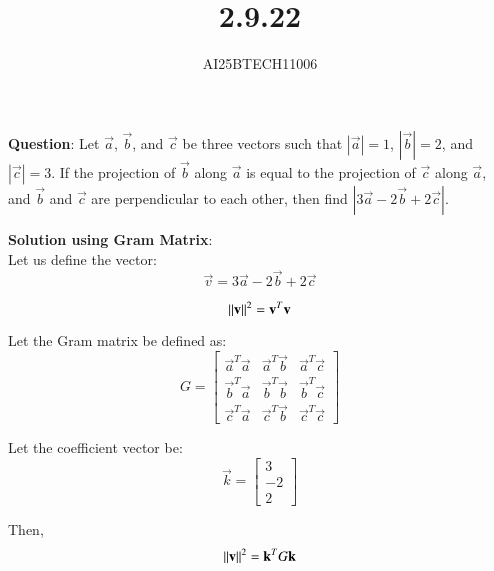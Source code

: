 \documentclass[journal]{IEEEtran}
\begin{document}

\vspace{3cm}

\title{2.9.22}
\author{AI25BTECH11006}
{\let\newpage\relax\maketitle}

\textbf{Question}: Let $\overrightarrow{a}$,
$\overrightarrow{b}$, and $\overrightarrow{c}$ be three vectors such that $|\overrightarrow{a}| = 1$, $|\overrightarrow{b}| = 2$, and $|\overrightarrow{c}| = 3$. If the
projection of $\overrightarrow{b}$ along $\overrightarrow{a}$ is equal to the projection of $\overrightarrow{c}$ along $\overrightarrow{a}$, and $\overrightarrow{b}$ and $\overrightarrow{c}$ are perpendicular to each other, then find $|3\overrightarrow{a} - 2\overrightarrow{b} + 2\overrightarrow{c}|$.

\textbf{Solution using Gram Matrix}:\\

Let us define the vector:
\begin{equation}
\vec{v} = 3\vec{a} - 2\vec{b} + 2\vec{c}
\end{equation}

\begin{equation}
\left\lVert\mathbf{v}\right\rVert^2 = \mathbf{v}^T \mathbf{v}
\end{equation}

Let the Gram matrix be defined as:
\begin{equation}
G = \begin{bmatrix}
\vec{a}^T\vec{a} & \vec{a}^T\vec{b} & \vec{a}^T\vec{c} \\
\vec{b}^T\vec{a} & \vec{b}^T\vec{b} & \vec{b}^T\vec{c} \\
\vec{c}^T\vec{a} & \vec{c}^T\vec{b} & \vec{c}^T\vec{c}
\end{bmatrix}
\end{equation}

Let the coefficient vector be:
\begin{equation}
\vec{k} = \begin{bmatrix} 3 \\ -2 \\ 2 \end{bmatrix}
\end{equation}

Then,
\begin{equation}
\left\lVert\mathbf{v}\right\rVert^2 = \mathbf{k}^T G \mathbf{k}
\end{equation}
\end{document}

